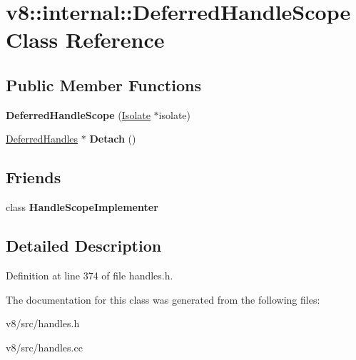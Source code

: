 \hypertarget{classv8_1_1internal_1_1DeferredHandleScope}{}\section{v8\+:\+:internal\+:\+:Deferred\+Handle\+Scope Class Reference}
\label{classv8_1_1internal_1_1DeferredHandleScope}
\subsection*{Public Member Functions}
\begin{DoxyCompactItemize}
\item 
\mbox{\label{classv8_1_1internal_1_1DeferredHandleScope_a2a9abeb6fc8fa52bedb8a4de7d8d502a}} 
{\bfseries Deferred\+Handle\+Scope} (\mbox{\hyperlink{classv8_1_1internal_1_1Isolate}{Isolate}} $\ast$isolate)
\item 
\mbox{\label{classv8_1_1internal_1_1DeferredHandleScope_a5aa6f8468dd39ead6bc36caec86db65f}} 
\mbox{\hyperlink{classv8_1_1internal_1_1DeferredHandles}{Deferred\+Handles}} $\ast$ {\bfseries Detach} ()
\end{DoxyCompactItemize}
\subsection*{Friends}
\begin{DoxyCompactItemize}
\item 
\mbox{\label{classv8_1_1internal_1_1DeferredHandleScope_a4212b6d1addb496cb92d67a2e399a1f3}} 
class {\bfseries Handle\+Scope\+Implementer}
\end{DoxyCompactItemize}


\subsection{Detailed Description}


Definition at line 374 of file handles.\+h.



The documentation for this class was generated from the following files\+:\begin{DoxyCompactItemize}
\item 
v8/src/handles.\+h\item 
v8/src/handles.\+cc\end{DoxyCompactItemize}
